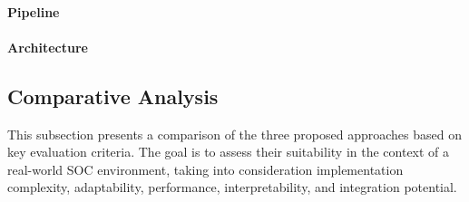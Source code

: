 \paragraph{Pipeline}
\paragraph{Architecture}


\subsection{Comparative Analysis}
This subsection presents a comparison of the three proposed approaches based on key evaluation criteria. 
The goal is to assess their suitability in the context of a real-world SOC environment, taking into consideration implementation complexity, adaptability, performance, interpretability, and integration potential.

